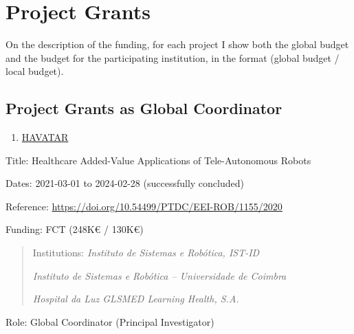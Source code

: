 \section{Project Grants}\label{project-grants}

On the description of the funding, for each project I show both the
global budget and the budget for the participating institution, in the
format (global budget / local budget).

\subsection{Project Grants as Global
Coordinator}\label{project-grants-as-global-coordinator}

\begin{enumerate}
\def\labelenumi{\arabic{enumi}.}
\item
  \ul{HAVATAR}
\end{enumerate}

Title: Healthcare Added-Value Applications of Tele-Autonomous Robots

Dates: 2021-03-01 to 2024-02-28 (successfully concluded)

Reference: \url{https://doi.org/10.54499/PTDC/EEI-ROB/1155/2020}

Funding: FCT (248K€ / 130K€)

\begin{quote}
Institutions: \emph{Instituto de Sistemas e Robótica, IST-ID}

\emph{Instituto de Sistemas e Robótica -- Universidade de Coimbra}

\emph{Hospital da Luz GLSMED Learning Health, S.A.}
\end{quote}

Role: Global Coordinator (Principal Investigator)

